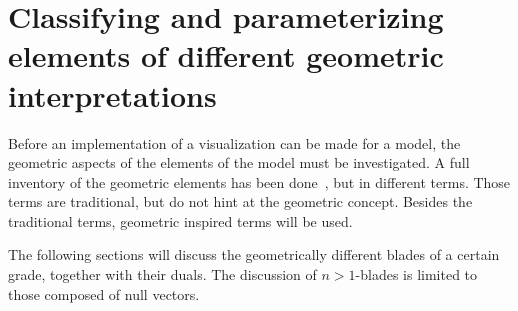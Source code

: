\section{Classifying and parameterizing elements of different geometric interpretations}
\label{ch:research}

Before an implementation of a visualization can be made for a model, the geometric aspects of the elements of the model must be investigated.  A full inventory of the geometric elements has been done~\cite[Chapter 3]{Pottmann}, but in different terms.  Those terms are traditional, but do not hint at the geometric concept.  Besides the traditional terms, geometric inspired terms will be used.  

The following sections will discuss the geometrically different blades of a certain grade, together with their duals.  The discussion of $n>1$-blades is limited to those composed of null vectors.  
%
%    



